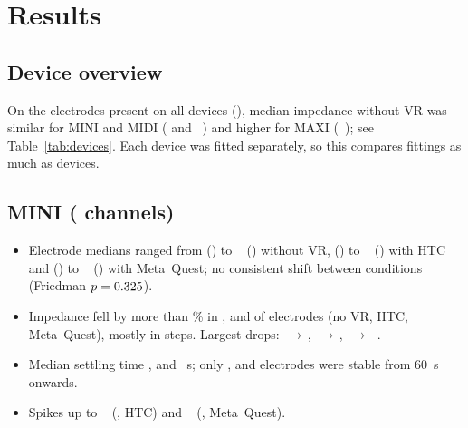 \documentclass[11pt,a4paper]{article}
\begin{document}
\section{Results}
\subsection{Device overview}
On the \impNCommon{} electrodes present on all devices (\impCommonChannels),
median impedance without VR was similar for MINI and MIDI
(\impMINICommonMedNoVR{} and \impMIDICommonMedNoVR~\impUnit) and higher for
MAXI (\impMAXICommonMedNoVR~\impUnit); see Table~\ref{tab:devices}. Each
device was fitted separately, so this compares fittings as much as devices.

\begin{table}[htbp]
  \centering
  \caption{Median over electrodes of the per-electrode median impedance
  (\impUnit): on the \impNCommon{} common electrodes and on all electrodes of
  each device (number of electrodes in brackets).}
  \label{tab:devices}
  \small
  
\end{table}

\subsection{MINI (\impMININChannels{} channels)}
\begin{itemize}
  \item Electrode medians ranged from \impMINIMedMinNoVR{} (\impMINIMedMinChNoVR) to
    \impMINIMedMaxNoVR~\impUnit{} (\impMINIMedMaxChNoVR) without VR,
    \impMINIMedMinHTC{} (\impMINIMedMinChHTC) to \impMINIMedMaxHTC~\impUnit{}
    (\impMINIMedMaxChHTC) with HTC and \impMINIMedMinMetaQuest{}
    (\impMINIMedMinChMetaQuest) to \impMINIMedMaxMetaQuest~\impUnit{}
    (\impMINIMedMaxChMetaQuest) with Meta~Quest; no consistent shift between
    conditions (Friedman \(p = 0.325\)).
  \item Impedance fell by more than \impTolPct\% in \impMININDecreaseNoVR,
    \impMININDecreaseHTC{} and \impMININDecreaseMetaQuest{} of
    \impMININChannels{} electrodes (no VR, HTC, Meta~Quest), mostly in steps.
    Largest drops: \impMINIDropChNoVR{}
    \impMINIDropInitNoVR\,\(\to\)\,\impMINIDropFinalNoVR, \impMINIDropChHTC{}
    \impMINIDropInitHTC\,\(\to\)\,\impMINIDropFinalHTC, \impMINIDropChMetaQuest{}
    \impMINIDropInitMetaQuest\,\(\to\)\,\impMINIDropFinalMetaQuest~\impUnit.
  \item Median settling time \impMINISettleMedNoVR, \impMINISettleMedHTC{} and
    \impMINISettleMedMetaQuest~s; only \impMININSettledSixtyNoVR,
    \impMININSettledSixtyHTC{} and \impMININSettledSixtyMetaQuest{} electrodes
    were stable from 60~s onwards.
  \item Spikes up to \impMINIMaxHTC~\impUnit{} (\impMINIMaxChHTC, HTC) and
    \impMINIMaxMetaQuest~\impUnit{} (\impMINIMaxChMetaQuest, Meta~Quest).
\end{itemize}
\end{document}
